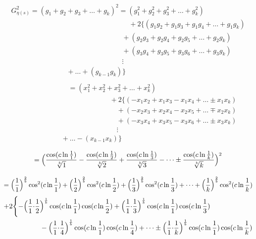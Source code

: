 \documentclass{amsart}
\begin{document}
	\[ \begin{array}{c}
		G_{\eta(s)}^2 = (g_1 + g_2 + g_3 + \dots + g_k)^2 = (g_1^2 + g_2^2 + g_3^2 + \dots + g_k^2) \\
		\qquad\qquad\qquad\qquad\qquad\qquad\qquad\qquad\quad + 2\{(g_1g_2 + g_1g_3 + g_1g_4 + \dots + g_{1}g_{k}) \\ 
		\qquad\qquad\qquad\qquad\qquad\qquad\qquad\qquad + (g_2g_3 + g_2g_4 + g_2g_5 + \dots + g_2g_{k}) \\ 
		\qquad\qquad\qquad\qquad\qquad\qquad\qquad\qquad + (g_3g_4 + g_3g_5 + g_3g_6 + \dots + g_3g_{k}) \\ 
		\qquad\qquad\qquad\qquad\qquad\qquad\qquad\qquad \vdots \\
		\qquad\qquad\qquad\qquad + \dots + (g_{k-1}g_{k}) \} \\ 
	\end{array} \]
	\[ \begin{array}{c}
		\qquad\qquad\qquad\quad = (x_1^2 + x_2^2 + x_3^2 + \dots + x_k^2) \\ 
		\qquad\qquad\qquad\qquad\qquad\qquad\quad + 2\{(-x_1x_2 + x_1x_3 - x_1x_4 + \dots \pm x_{1}x_{k}) \\ 
		\qquad\qquad\qquad\qquad\qquad\qquad\qquad + (-x_2x_3 + x_2x_4 - x_2x_5 + \dots \mp x_{2}x_{k}) \\ 
		\qquad\qquad\qquad\qquad\qquad\qquad\qquad + (-x_3x_4 + x_3x_5 - x_3x_6 + \dots \pm x_{3}x_{k}) \\ 
		\qquad\qquad\qquad\qquad\qquad\qquad\qquad \vdots \\
		\qquad\qquad\qquad + \dots - (x_{k-1}x_{k}) \} \\ 
	\end{array} \]
	\[\]
	\[\]
	\[ = \Bigl( \frac{\cos({c\ln \frac{1}{1}})}{\sqrt[b]{1}} - \frac{\cos({c\ln \frac{1}{2}})}{\sqrt[b]{2}} + \frac{\cos({c\ln \frac{1}{3}})}{\sqrt[b]{3}} - \dots \pm \frac{\cos({c\ln \frac{1}{k}})}{\sqrt[b]{k}} \Bigr)^2 \]
	\[\]
	\[\]
	\[ = \Bigl( \frac{1}{1} \Bigr)^{\frac2b}\cos^2({c \ln \frac{1}{1}}) + \Bigl( \frac{1}{2} \Bigr)^{\frac2b}\cos^2({c \ln \frac{1}{2}}) + \Bigl( \frac{1}{3} \Bigr)^{\frac2b}\cos^2({c \ln \frac{1}{3}}) + \dots + \Bigl( \frac{1}{k} \Bigr)^{\frac2b}\cos^2({c \ln \frac{1}{k}}) \]
	\[
	\begin{aligned}
		+2\Biggl\{ -\Bigl( \frac{1}{1} {\cdot} \frac{1}{2}& \Bigr)^\frac1b \cos(c \ln \frac{1}{1}) \cos(c \ln \frac{1}{2}) + \Bigl( \frac{1}{1} {\cdot} \frac{1}{3} \Bigr)^\frac1b \cos(c \ln \frac{1}{1}) \cos(c \ln \frac{1}{3}) \\ 
		& - \Bigl( \frac{1}{1} {\cdot} \frac{1}{4} \Bigr)^\frac1b \cos(c \ln \frac{1}{1}) \cos(c \ln \frac{1}{4}) + \dots \pm \Bigl( \frac{1}{1} {\cdot} \frac{1}{k} \Bigr)^\frac1b \cos(c \ln \frac{1}{1}) \cos(c \ln \frac{1}{k}) \\ 		
	\end{aligned}
	\]
\end{document}
